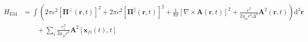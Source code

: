 \documentclass{article}
\begin{document}
\begin{equation}
\begin{split}
H_\mathrm{EM} &= \int\left(2\pi c^2\left[\bm{\Pi}^\perp(\mathbf{r},t)\right]^2 + 2\pi c^2\left[\bm{\Pi}^\parallel(\mathbf{r},t)\right]^2 +  \frac{1}{8\pi}\left[\nabla\times\mathbf{A}(\mathbf{r},t)\right]^2 + \frac{e^2}{2\eta_m c^2\Delta^2}\mathbf{A}^2(\mathbf{r},t)\right)\mathrm{d}^3\mathbf{r}\\
&\qquad+ \sum_i\frac{e_i^2}{2\mu_{fi}c^2}\mathbf{A}^2[\mathbf{x}_{fi}(t),t]\\

\end{split}
\end{equation}
\end{document}
